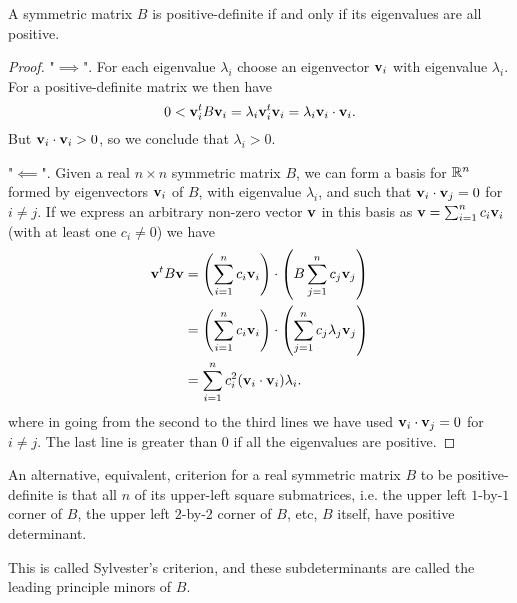 \documentclass[10pt, a4paper]{article}
\begin{document}
\begin{proposition}
    A symmetric matrix $B$ is positive-definite if and only if its eigenvalues are all positive.

    \begin{proof}
        "$\implies$".
        For each eigenvalue $\lambda_i$ choose an eigenvector $\mathbf{v}_i$ with eigenvalue $\lambda_i$.
        For a positive-definite matrix we then have
        \[
        0 < \mathbf{v}_i ^ tB\mathbf{v}_i = \lambda_i\mathbf{v}_i ^ t\mathbf{v}_i = \lambda_i \mathbf{v}_i \cdot \mathbf{v}_i.
        \]
        But $\mathbf{v}_i \cdot \mathbf{v}_i > 0$,
        so we conclude that $\lambda_i > 0$.

        "$\impliedby$".
        Given a real $n \times n$ symmetric matrix $B$,
        we can form a basis for $\mathbb{R} ^ n$ formed by eigenvectors $\mathbf{v}_i$ of $B$,
        with eigenvalue $\lambda_i$,
        and such that $\mathbf{v}_i \cdot \mathbf{v}_j = 0$ for $i \neq j$.
        If we express an arbitrary non-zero vector $\mathbf{v}$ in this basis as $\mathbf{v} = \sum_{i = 1}^{n}c_i\mathbf{v}_i$
        (with at least one $c_i \neq 0$) we have
        \begin{align*}
            \mathbf{v} ^ tB\mathbf{v} &= \left(\sum_{i = 1}^{n}c_i\mathbf{v}_i\right)\cdot \left(B\sum_{j = 1}^{n}c_j\mathbf{v}_j\right) \\
            &= \left(\sum_{i = 1}^{n}c_i\mathbf{v}_i\right)\cdot \left(\sum_{j = 1}^{n}c_j\lambda_j\mathbf{v}_j\right) \\
            &= \sum_{i = 1}^{n}c_i ^ 2(\mathbf{v}_i \cdot \mathbf{v}_i)\lambda_i.
        \end{align*}
        where in going from the second to the third lines we have used $\mathbf{v}_i \cdot \mathbf{v}_j = 0$ for $i \neq j$.
        The last line is greater than $0$ if all the eigenvalues are positive.
    \end{proof}
\end{proposition}

\begin{proposition}
    An alternative,
    equivalent,
    criterion for a real symmetric matrix $B$ to be positive-definite is that all $n$ of its upper-left square submatrices,
    i.e.
    the upper left $1$-by-$1$ corner of $B$,
    the upper left $2$-by-$2$ corner of $B$,
    etc,
    $B$ itself,
    have positive determinant.

    This is called Sylvester's criterion,
    and these subdeterminants are called the leading principle minors of $B$.
\end{proposition}
\end{document}
